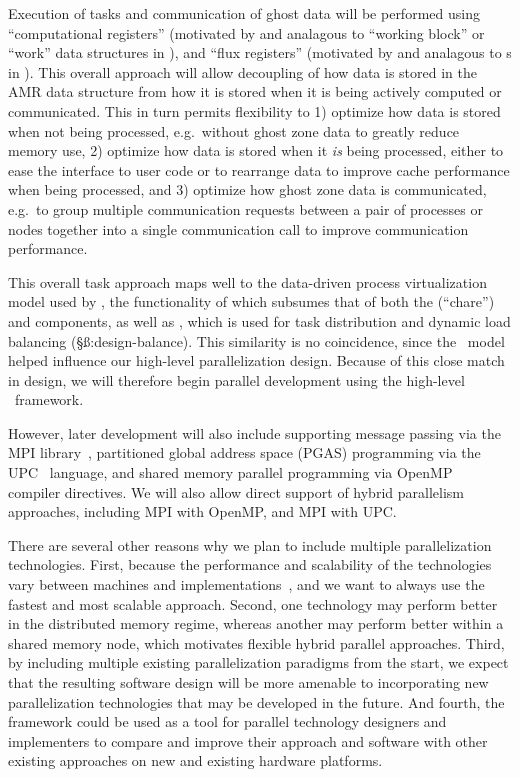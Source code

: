 \documentclass[10pt]{article}
\begin{document}
Execution of tasks and communication of ghost data will be performed
using ``computational registers'' (motivated by and analagous to
``working block'' or ``work'' data structures in \paramesh), and
``flux registers'' (motivated by and analagous to
s in \chombo).  This overall approach will
allow decoupling of how data is stored in the AMR data structure from
how it is stored when it is being actively computed or communicated.
This in turn permits flexibility to 1) optimize how data is stored
when not being processed, e.g.~without ghost zone data to greatly
reduce memory use, 2) optimize how data is stored when it \textit{is}
being processed, either to ease the interface to user code or to
rearrange data to improve cache performance when being processed, and
3) optimize how ghost zone data is communicated, e.g.~to group
multiple communication requests between a pair of processes or nodes
together into a single communication call to improve communication
performance.

This overall task approach maps well to the data-driven process
virtualization model used by \charm, the functionality of which
subsumes that of both the  (``chare'') and 
components, as well as , which is used for task
distribution and dynamic load balancing (\S\ss:design-balance).  This
similarity is no coincidence, since the \charm\ model helped influence
our high-level parallelization design.  Because of this close match in
design, we will therefore begin parallel development using the
high-level \charm\ framework.  

However, later development will also include supporting message
passing via the MPI library~\cite{wwwmpi}, partitioned global address
space (PGAS) programming via the UPC~\cite{@@@UPC} language, and
shared memory parallel programming via OpenMP~\cite{@@@OpenMP}
compiler directives.  We will also allow direct support of hybrid
parallelism approaches, including MPI with OpenMP, and MPI with UPC.

There are several other reasons why we plan to include multiple
parallelization technologies.  First, because the performance and
scalability of the technologies vary between machines and
implementations~\cite{MaTa09}, and we want to always use the fastest
and most scalable approach.  Second, one technology may perform better
in the distributed memory regime, whereas another may perform better
within a shared memory node, which motivates flexible hybrid parallel
approaches.  Third, by including multiple existing parallelization
paradigms from the start, we expect that the resulting software design
will be more amenable to incorporating new parallelization
technologies that may be developed in the future.  And fourth, the
framework could be used as a tool for parallel technology designers
and implementers to compare and improve their approach and software
with other existing approaches on new and existing hardware platforms.
\end{document}
